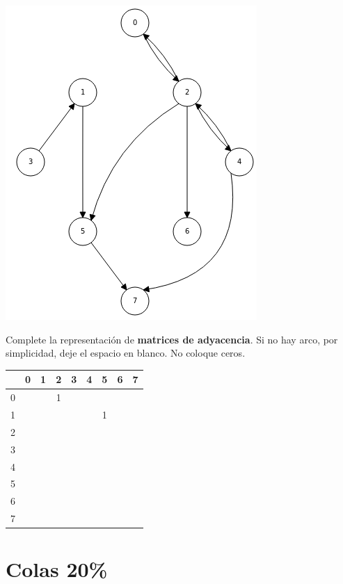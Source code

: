 \documentclass[twocolumn]{article}
\begin{document}
\begin{center}
\includegraphics[scale=0.5]{grafin.png}
\end{center}

 Complete la representación de \textbf{matrices de adyacencia}. Si no hay arco,
  por simplicidad, deje el espacio en blanco. No coloque ceros.

\begin{center}
\begin{tabular}{| c | c | c | c | c | c | c | c | c |}
\hline
  & 0 & 1 & 2 & 3 & 4 & 5 & 6 & 7 \\
\hline
0 &   &   & 1  &  &   &   &   &   \\
\hline
1 &   &   &   &   &   & 1  &   &   \\
\hline
2 &   &   &   &   &   &   &   &   \\
\hline
3 &   &   &   &   &   &   &   &   \\
\hline
4 &   &   &   &   &   &   &   &   \\
\hline
5 &   &   &   &   &   &   &   &   \\
\hline
6 &   &   &   &   &   &   &   &   \\
\hline
7 &   &   &   &   &   &   &   &   \\ 
\hline
\end{tabular}
\end{center}

\section{Colas 20\%}
\end{document}
